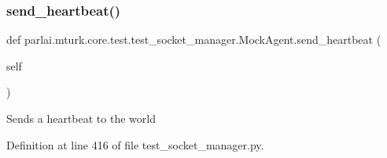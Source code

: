 \subsubsection{\texorpdfstring{send\+\_\+heartbeat()}{send\_heartbeat()}}
{\footnotesize\ttfamily def parlai.\+mturk.\+core.\+test.\+test\+\_\+socket\+\_\+manager.\+Mock\+Agent.\+send\+\_\+heartbeat (\begin{DoxyParamCaption}\item[{}]{self }\end{DoxyParamCaption})}

\begin{DoxyVerb}Sends a heartbeat to the world\end{DoxyVerb}
 

Definition at line 416 of file test\+\_\+socket\+\_\+manager.\+py.



